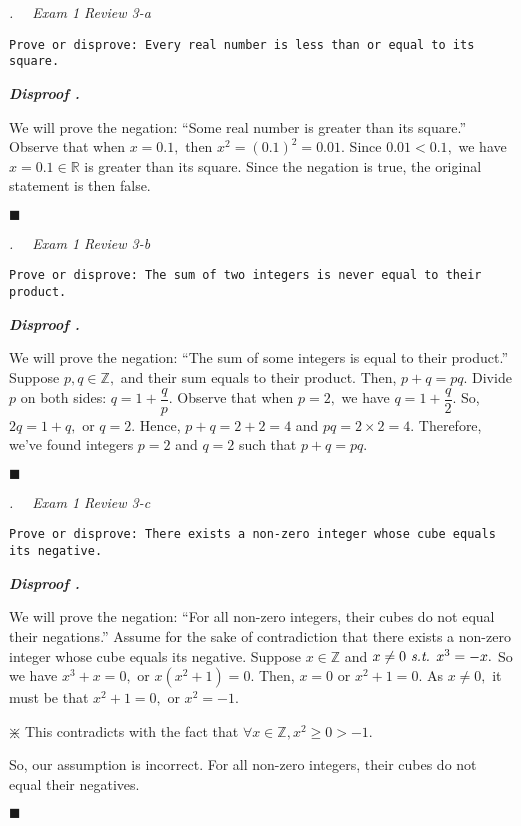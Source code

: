 \documentclass[11pt,letter]{article}
\newcounter{nq}[section]
\newcounter{np}[section]
\newenvironment*{dis}{\par\noindent\textbf{\textit{Disproof \stepcounter{np}\thenp. }}\par}{\par\hfill $\blacksquare$\par}
\newenvironment*{q}[1]{\noindent\emph{\thesection.\stepcounter{nq}\thenq$\quad $ #1}\par\noindent\texttt}{}
\def\Z{{\mathbb{Z}}}
\def\R{{\mathbb{R}}}
\def\st{\emph{ s.t. }}
\begin{document}
\begin{framed}\begin{q}
	{Exam 1 Review 3-a}
	{Prove or disprove: Every real number is less than or equal to its square.}
\end{q}\end{framed}
\begin{dis}
	We will prove the negation: ``Some real number is greater than its square.''	Observe that when $x=0.1,$ then $x^2=(0.1)^2=0.01.$ Since $0.01<0.1,$ we have $x=0.1\in\R$ is greater than its square. Since the negation is true, the original statement is then false.
\end{dis}

\begin{framed}\begin{q}
	{Exam 1 Review 3-b}
	{Prove or disprove: The sum of two integers is never equal to their product.}
\end{q}\end{framed}
\begin{dis}
	We will prove the negation: ``The sum of some integers is equal to their product.'' Suppose $p,q\in\Z,$ and their sum equals to their product. Then, $p+q=pq.$ Divide $p$ on both sides: $q=1+\dfrac{q}{p}.$ Observe that when $p=2,$ we have $q=1+\dfrac{q}{2}.$ So, $2q=1+q,$ or $q=2$. Hence, $p+q=2+2=4$ and $pq=2\times2=4.$ Therefore, we've found integers $p=2$ and $q=2$ such that $p+q=pq.$
\end{dis}

\begin{framed}\begin{q}
	{Exam 1 Review 3-c}
	{Prove or disprove: There exists a non-zero integer whose cube equals its negative.}
\end{q}\end{framed}
\begin{dis}
	We will prove the negation: ``For all non-zero integers, their cubes do not equal their negations.'' Assume for the sake of contradiction that there exists a non-zero integer whose cube equals its negative. Suppose $x\in\Z$ and $x\neq0\st x^3=-x.$ So we have $x^3+x=0,$ or $x(x^2+1)=0.$ Then, $x=0$ or $x^2+1=0.$ As $x\neq0,$ it must be that $x^2+1=0,$ or $x^2=-1.$\begin{center}$\divideontimes$ This contradicts with the fact that $\forall x\in\Z, x^2\geq0>-1.$\end{center} So, our assumption is incorrect. For all non-zero integers, their cubes do not equal their negatives.
\end{dis}
\end{document}
